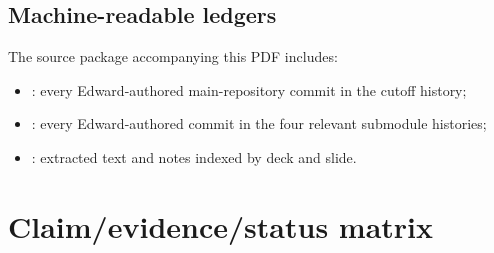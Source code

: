 \documentclass[11pt,oneside]{report}
\begin{document}
\section{Machine-readable ledgers}

The source package accompanying this PDF includes:

\begin{itemize}
  \item {}: every Edward-authored main-repository commit in the cutoff history;
  \item {}: every Edward-authored commit in the four relevant submodule histories;
  \item {}: extracted text and notes indexed by deck and slide.
\end{itemize}

\chapter{Claim/evidence/status matrix}
\label{app:claim-matrix}
\end{document}
